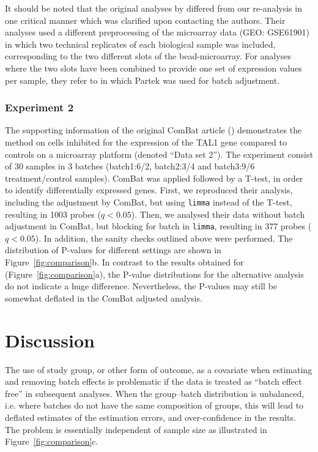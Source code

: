 \documentclass{bio}
\begin{document}
It should be noted that the original analyses by \citet{Towfic2014} differed from our re-analysis in one critical manner which was clarified upon contacting the authors. Their analyses used a different preprocessing of the microarray data (GEO: GSE61901) in which two technical replicates of each biological sample was included, corresponding to the two different slots of the bead-microarray. For analyses where the two slots have been combined to provide one set of expression values per sample, they refer to \citet{Bakshi2013} in which Partek was used for batch adjustment.

\subsubsection{Experiment 2}

The supporting information of the original ComBat article (\citealp{Johnson2007}) demonstrates the method on cells inhibited for the expression of the TAL1 gene compared to controls on a microarray platform (denoted ``Data set 2''). The experiment consist of 30 samples in 3 batches (batch1:6/2, batch2:3/4 and batch3:9/6 treatment/control samples). ComBat was applied followed by a T-test, in order to identify differentially expressed genes. First, we reproduced their analysis, including the adjustment by ComBat, but using \texttt{limma} instead of the T-test, resulting in 1003 probes ($q<0.05$).  Then, we analysed their data without batch adjustment in ComBat, but blocking for batch in \texttt{limma}, resulting in 377 probes ($q<0.05$). In addition, the sanity checks outlined above were performed. The distribution of P-values for different settings are shown in Figure~\ref{fig:comparison}b. In contrast to the results obtained for \citet{Towfic2014} (Figure~\ref{fig:comparison}a), the P-value distributions for the alternative analysis do not indicate a huge difference. Nevertheless, the P-values may still be somewhat deflated in the ComBat adjusted analysis.


\section{Discussion}

The use of study group, or other form of outcome, as a covariate when estimating and removing batch effects is problematic if the data is treated as ``batch effect free'' in subsequent analyses. When the group--batch distribution is unbalanced, i.e. where batches do not have the same composition of groups, this will lead to deflated estimates of the estimation errors, and over-confidence in the results. The problem is essentially independent of sample size as illustrated in Figure~\ref{fig:comparison}c.
\end{document}
